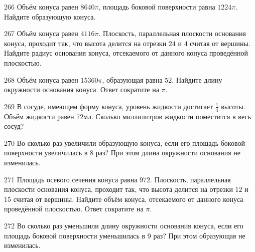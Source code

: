 \documentclass[a4paper]{article}
\begin{document}
\begin{taskBN}{266}
Объём конуса равен $8640\pi$, площадь боковой поверхности равна $1224\pi$. Найдите образующую конуса. 
\end{taskBN}

\begin{taskBN}{267}
Объём конуса равен $4116\pi$. Плоскость, параллельная плоскости основания конуса,  проходит так, что высота делится на отрезки $24$ и $4$ считая от вершины. Найдите радиус основания конуса, отсекаемого от данного конуса проведённой плоскостью. 
\end{taskBN}

\begin{taskBN}{268}
Объём конуса равен $15360\pi$, образующая равна $52$. Найдите длину окружности основания конуса. Ответ сократите на $\pi$.
\end{taskBN}

\begin{taskBN}{269}
В сосуде, имеющем форму конуса, уровень жидкости достигает $\frac{1}{4}$ высоты. Объём жидкости равен 72мл. Сколько миллилитров жидкости поместится в весь сосуд?
\end{taskBN}

\begin{taskBN}{270}
Во сколько раз увеличили образующую конуса, если его площадь боковой поверхности увеличилась в 8 раз? При этом длина окружности основания не изменилась.
\end{taskBN}

\begin{taskBN}{271}
Площадь осевого сечения конуса равна $972$. Плоскость, параллельная плоскости основания конуса,  проходит так, что высота делится на отрезки $12$ и $15$ считая от вершины. Найдите объём конуса, отсекаемого от данного конуса проведённой плоскостью. Ответ сократите на $\pi$.
\end{taskBN}

\begin{taskBN}{272}
Во сколько раз уменьшили длину окружности основания конуса, если его площадь боковой поверхности уменьшилась в 9 раз? При этом образующая не изменилась.
\end{taskBN}
\end{document}
